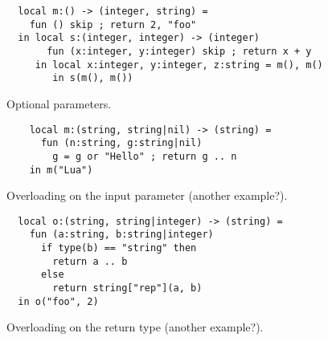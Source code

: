 
\begin{verbatim}
  local m:() -> (integer, string) =
    fun () skip ; return 2, "foo"
  in local s:(integer, integer) -> (integer)
       fun (x:integer, y:integer) skip ; return x + y
     in local x:integer, y:integer, z:string = m(), m()
        in s(m(), m())
\end{verbatim}

Optional parameters.

\begin{verbatim}
    local m:(string, string|nil) -> (string) =
      fun (n:string, g:string|nil)
        g = g or "Hello" ; return g .. n
    in m("Lua")
\end{verbatim}

Overloading on the input parameter (another example?).

\begin{verbatim}
  local o:(string, string|integer) -> (string) =
    fun (a:string, b:string|integer)
      if type(b) == "string" then
        return a .. b
      else
        return string["rep"](a, b)
  in o("foo", 2) 
\end{verbatim}

Overloading on the return type (another example?).

